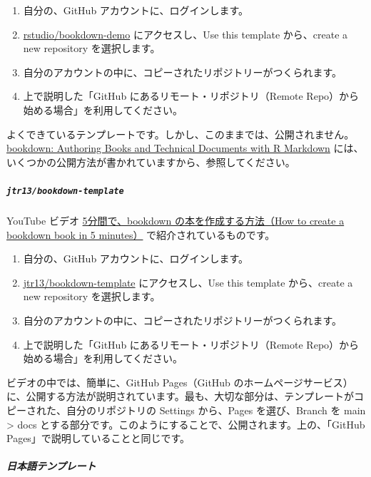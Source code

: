 \documentclass[
]{bxjsbook}
\providecommand{\tightlist}{%
  \setlength{\itemsep}{0pt}\setlength{\parskip}{0pt}}
\theoremstyle{definition}
\theoremstyle{definition}
\theoremstyle{definition}
\theoremstyle{definition}
\theoremstyle{remark}
\begin{document}
\begin{enumerate}
\def\labelenumi{\arabic{enumi}.}
\tightlist
\item
  自分の、GitHub アカウントに、ログインします。
\item
  \href{https://github.com/rstudio/bookdown-demo}{rstudio/bookdown-demo} にアクセスし、Use this template から、create a new repository を選択します。
\item
  自分のアカウントの中に、コピーされたリポジトリーがつくられます。
\item
  上で説明した「GitHub にあるリモート・リポジトリ（Remote Repo）から始める場合」を利用してください。
\end{enumerate}

よくできているテンプレートです。しかし、このままでは、公開されません。\href{https://bookdown.org/yihui/bookdown/}{bookdown: Authoring Books and Technical Documents with R Markdown} には、いくつかの公開方法が書かれていますから、参照してください。

\hypertarget{jtr13bookdown-template}{%
\subparagraph{\texorpdfstring{\texttt{jtr13/bookdown-template}}{jtr13/bookdown-template}}\label{jtr13bookdown-template}}

YouTube ビデオ \href{https://www.youtube.com/watch?v=m5D-yoH416Y}{5分間で、bookdown の本を作成する方法（How to create a bookdown book in 5 minutes）} で紹介されているものです。

\begin{enumerate}
\def\labelenumi{\arabic{enumi}.}
\tightlist
\item
  自分の、GitHub アカウントに、ログインします。
\item
  \href{https://github.com/jtr13/bookdown-template}{jtr13/bookdown-template} にアクセスし、Use this template から、create a new repository を選択します。
\item
  自分のアカウントの中に、コピーされたリポジトリーがつくられます。
\item
  上で説明した「GitHub にあるリモート・リポジトリ（Remote Repo）から始める場合」を利用してください。
\end{enumerate}

ビデオの中では、簡単に、GitHub Pages（GitHub のホームページサービス）に、公開する方法が説明されています。最も、大切な部分は、テンプレートがコピーされた、自分のリポジトリの Settings から、Pages を選び、Branch を main \textgreater{} docs とする部分です。このようにすることで、公開されます。上の、「GitHub Pages」で説明していることと同じです。

\hypertarget{ux65e5ux672cux8a9eux30c6ux30f3ux30d7ux30ecux30fcux30c8}{%
\subparagraph{日本語テンプレート}\label{ux65e5ux672cux8a9eux30c6ux30f3ux30d7ux30ecux30fcux30c8}}
\end{document}
